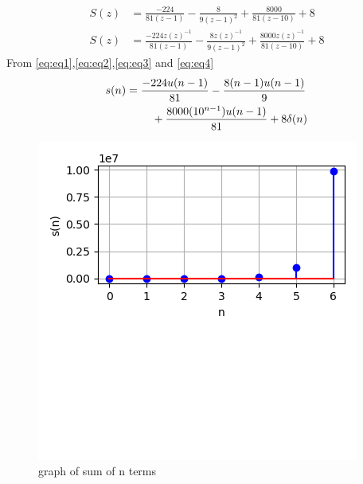\documentclass[journal,12pt,twocolumn]{IEEEtran}
\begin{document}
\begin{align}
 S(z)&=\frac{-224}{81(z-1)}-\frac{8}{9(z-1)^2}+\frac{8000}{81(z-10)}+8\\
 S(z)&=\frac{-224z(z)^{-1}}{81(z-1)}-\frac{8z(z)^{-1}}{9(z-1)^2}+\frac{8000z(z)^{-1}}{81(z-10)}+8
 \end{align}
 From \eqref{eq:eq1},\eqref{eq:eq2},\eqref{eq:eq3} and \eqref{eq:eq4}
 \begin{align}
 \notag s(n)&=\frac{-224u(n-1)}{81}-\frac{8(n-1)u(n-1)}{9}\\&~~~~~~~
 +\frac{8000(10^{n-1})u(n-1)}{81}+8\delta (n)
\end{align}
\begin{figure}[h!]
    \centering
    \includegraphics[width=\columnwidth]{figs/plot.png}
    \caption{graph of sum of n terms}
    \label{fig:1}
\end{figure}
 
\end{document}
